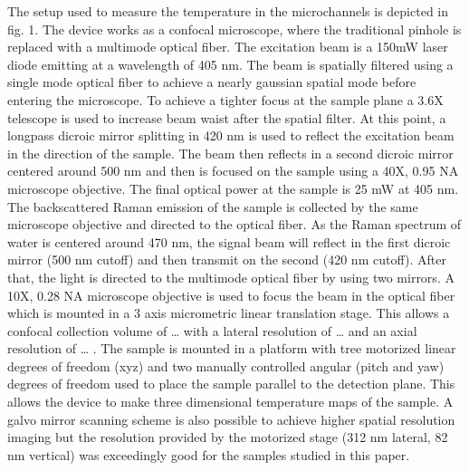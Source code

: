 \documentclass[twocolumn]{svjour3}       %
\begin{document}
The setup used to measure the temperature in the microchannels is depicted in fig. 1. The device works as a confocal microscope, where the traditional pinhole is replaced with a multimode optical fiber. The excitation beam is a 150mW laser diode emitting at a wavelength of 405 nm. The beam is spatially filtered using a single mode optical fiber to achieve a nearly gaussian spatial mode before entering the microscope. To achieve a tighter focus at the sample plane a 3.6X telescope is used to increase beam waist after the spatial filter. At this point, a longpass dicroic mirror splitting in 420 nm is used to reflect the excitation beam in the direction of the sample. The beam then reflects in a second dicroic mirror centered around 500 nm and then is focused on the sample using a 40X, 0.95 NA microscope objective. The final optical power at the sample is 25 mW at 405 nm. The backscattered Raman emission of the sample is collected by the same microscope objective and directed to the optical fiber. As the Raman spectrum of water is centered around 470 nm, the signal beam will reflect in the first dicroic mirror (500 nm cutoff) and then transmit on the second (420 nm cutoff). After that, the light is directed to the multimode optical fiber by using two mirrors. A 10X, 0.28 NA microscope objective is used to focus the beam in the optical fiber which is mounted in a 3 axis micrometric linear translation stage. This allows a confocal collection volume of … with a lateral resolution of … and an axial resolution of … . The sample is mounted in a platform with tree motorized linear degrees of freedom (xyz) and two manually controlled angular (pitch and yaw) degrees of freedom used to place the sample parallel to the detection plane. This allows the device to make three dimensional temperature maps of the sample. A galvo mirror scanning scheme is also possible to achieve higher spatial resolution imaging but the resolution provided by the motorized stage (312 nm lateral, 82 nm vertical) was exceedingly good for the samples studied in this paper.
\end{document}

